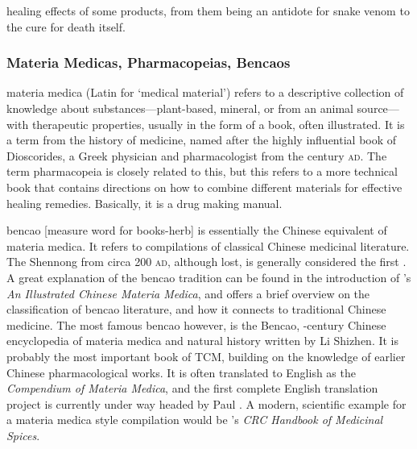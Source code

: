 healing effects of some products, from them being an antidote for snake venom to the cure for death itself.

\subsubsection{Materia Medicas, Pharmacopeias, Bencaos}

\Gls{materia medica} (Latin for `medical material') refers to a descriptive collection of knowledge about substances---plant-based, mineral, or from an animal source---with therapeutic properties, usually in the form of a book, often illustrated. It is a term from the history of medicine, named after the highly influential book of Dioscorides, a Greek physician and pharmacologist from the  century \textsc{ad}. The term \gls{pharmacopeia} is closely related to this, but this refers to a more technical book that contains directions on how to combine different materials for effective healing remedies. Basically, it is a drug making manual.

\Gls{bencao}  [measure word for books-herb] is essentially the Chinese equivalent of materia medica. It refers to compilations of classical Chinese medicinal literature. The \gls{Shennong} from circa 200 \textsc{ad}, although lost, is generally considered the first \autocites[see][]{nugent-head_first_2014}{yang_divine_1998}. A great explanation of the \gls{bencao} tradition can be found in the introduction of \textcite{wu_illustrated_2005}'s \textit{An Illustrated Chinese Materia Medica}, and \textcite{zhao_concise_2018} offers a brief overview on the classification of \gls{bencao} literature, and how it connects to traditional Chinese medicine. The most famous \gls{bencao} however, is the \gls{Bencao}, -century Chinese encyclopedia of materia medica and natural history written by Li Shizhen. It is probably the most important book of \gls{TCM}, building on the knowledge of earlier Chinese pharmacological works. It is often translated to English as the \textit{Compendium of Materia Medica}, and the first complete English translation project is currently under way headed by Paul \textcite{unschuld_first_2022}. 
A modern, scientific example for a materia medica style compilation would be \textcite{duke_crc_2002}'s \textit{CRC Handbook of Medicinal Spices}.

